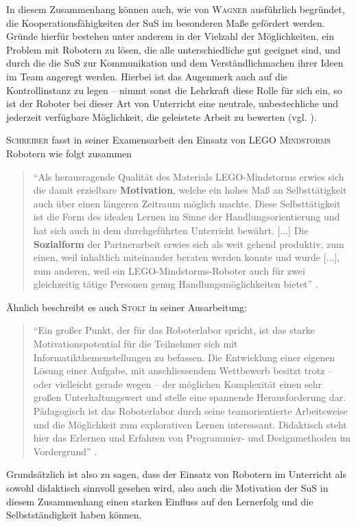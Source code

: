 \documentclass[paper=a4, DIV=calc, BCOR=15mm, twoside=on, onecolumn=on, open = right, titlepage =on, parskip =half, headsepline = on, footsepline = on, chapterprefix = off, appendixprefix = off, fontsize = 12pt, numbers = noenddot, abstract = on]{scrbook}
\begin{document}
In diesem Zusammenhang können auch, wie von \textsc{Wagner} ausführlich begründet, die Kooperationsfähigkeiten der SuS im besonderen Maße gefördert werden. Gründe hierfür bestehen unter anderem in der Vielzahl der Möglichkeiten, ein Problem mit Robotern zu lösen, die alle unterschiedliche gut geeignet sind, und durch die die SuS zur Kommunikation und dem Verständlichmachen ihrer Ideen im Team angeregt werden. Hierbei ist das Augenmerk auch auf die Kontrollinstanz zu legen -- nimmt sonst die Lehrkraft diese Rolle für sich ein, so ist der Roboter bei dieser Art von Unterricht eine neutrale, unbestechliche und jederzeit verfügbare Möglichkeit, die geleistete Arbeit zu bewerten (vgl. \cite[S.6f.]{wagner:05}).

\textsc{Schreiber} fasst in seiner Examensarbeit den Einsatz von \textsc{LEGO Mindstorms} Robotern wie folgt zusammen
\begin{quote}
"`Als herausragende Qualität des Materials LEGO-Mindstorms erwies sich die damit erzielbare \textbf{Motivation}, welche ein hohes Maß an Selbsttätigkeit auch über einen längeren Zeitraum möglich machte. Diese Selbsttätigkeit ist die Form des idealen Lernen im Sinne der Handlungsorientierung und hat sich auch in dem durchgeführten Unterricht bewährt. [...] Die \textbf{Sozialform} der Partnerarbeit erwies sich als weit gehend produktiv, zum einen, weil inhaltlich miteinander beraten werden konnte und wurde [...], zum anderen, weil ein LEGO-Mindstorms-Roboter auch für zwei gleichzeitig tätige Personen genug Handlungsmöglichkeiten bietet"' \cite[S.47f.]{schreiber:04}.
\end{quote}
Ähnlich beschreibt es auch \textsc{Stolt} in seiner Ausarbeitung:
\begin{quote}
"`Ein großer Punkt, der für das Roboterlabor spricht, ist das starke Motivationspotential für die Teilnehmer sich mit Informatikthemenstellungen zu befassen. Die Entwicklung einer eigenen Lösung einer Aufgabe, mit anschliessendem Wettbewerb besitzt trotz – oder vielleicht gerade wegen – der möglichen Komplexität einen sehr großen Unterhaltungswert und stelle eine spannende Herausforderung dar. Pädagogisch ist das Roboterlabor durch seine teamorientierte Arbeitsweise und die Möglichkeit zum explorativen Lernen interessant. Didaktisch steht hier das Erlernen und Erfahren von Programmier- und Designmethoden im Vordergrund"' \cite[S.5f.]{stolt:01}.
\end{quote}

Grundsätzlich ist also zu sagen, dass der Einsatz von Robotern im Unterricht als sowohl didaktisch sinnvoll gesehen wird, also auch die Motivation der SuS in diesem Zusammenhang einen starken Einfluss auf den Lernerfolg und die Selbstständigkeit haben können.\\
\end{document}

